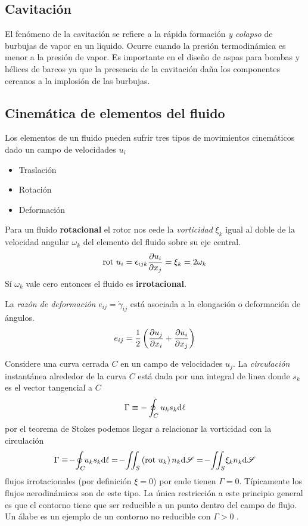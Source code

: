 \subsection{Cavitación}
El fenómeno de la cavitación se refiere a la rápida formación \textit{y colapso} de burbujas de vapor en un liquido. Ocurre cuando la presión termodinámica es menor a la presión de vapor. Es importante en el diseño de aspas para bombas y hélices de barcos ya que la presencia de la cavitación daña los componentes cercanos a la implosión de las burbujas.

\subsection{Cinemática de elementos del fluido} \label{sec:CinematicaDeElementosdeFluido}
Los elementos de un fluido pueden sufrir tres tipos de movimientos cinemáticos dado un campo de velocidades $u_i$ 
\begin{itemize}
    \item Traslación
    \item Rotación
    \item Deformación
\end{itemize}

Para un fluido \textbf{rotacional} el rotor nos cede la \textit{vorticidad} $\xi_k$ igual al doble de la velocidad angular $\omega_k$ del elemento del fluido sobre su eje central.
\begin{equation}
    \textrm{rot } u_i =\epsilon_{ijk}\frac{\partial u_i}{\partial x_j}=\xi_k= 2\omega_k 
\end{equation}
Sí $\omega_k$ vale cero entonces el fluido es \textbf{irrotacional}. 

La \textit{razón de deformación} $e_{ij}=\dot{\gamma}_{ij}$ está asociada a la elongación o deformación de ángulos. \begin{equation}
    e_{ij}=\frac{1}{2}\left( \frac{\partial u_j}{\partial x_i}+\frac{\partial u_i}{\partial x_j}\right)
\end{equation}

Considere una curva cerrada $C$ en un campo de velocidades $u_j$. La \textit{circulación} instantánea alrededor de la curva $C$ está dada por una integral de linea donde $s_k$ es el vector tangencial a $C$
\begin{equation}
    \Gamma \equiv - \oint_C u_k s_k \textrm{d} \ell
\end{equation}
por el teorema de Stokes podemos llegar a relacionar la vorticidad con la circulación
\[
\Gamma \equiv\! -\! \oint_C\!\! u_k s_k \di \ell =\! -\!\iint_S \left( \rotor u_k \right)n_k\di \sur=\! -\!\iint_S\! \xi_k n_k\di \sur
\]
flujos irrotacionales (por definición $\xi=0$) por ende tienen $\Gamma=0$. Típicamente los flujos aerodinámicos son de este tipo. La única restricción a este principio general es que el contorno tiene que ser reducible a un punto dentro del campo de flujo. Un álabe es un ejemplo de un contorno no reducible con $\Gamma>0$ \citep{durst2008fluid}.



